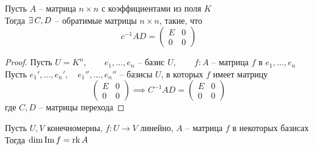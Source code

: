 \begin{implication}
	Пусть $ A $ -- матрица $ n \times n $ с коэффициентами из поля $ K $ \\
    Тогда $ \exists\, C, D $ -- обратимые матрицы $ n \times n $, такие, что
    $$ c^{-1} A D =
    \begin{pmatrix}
    	E & 0 \\
        0 & 0
    \end{pmatrix} $$
\end{implication}

\begin{proof}
	Пусть $ U = K^n, \qquad e_1, ..., e_n $ -- базис $ U, \qquad f : A $ -- матрица $ f $ в $ e_1, ..., e_n $ \\
    Пусть $ e_1', ..., e_n', \quad e_1'', ..., e_n'' $ -- базисы $ U $, в которых $ f $ имеет матрицу
    $$
    \begin{pmatrix}
    	E & 0 \\
        0 & 0
    \end{pmatrix} \implies C^{-1} A D =
    \begin{pmatrix}
    	E & 0 \\
        0 & 0
    \end{pmatrix} $$
    где $ C, D $ -- матрицы перехода
\end{proof}

\begin{theorem}
	Пусть $ U, V $ конечномерны, $ f : U \to V $ линейно, $ A $ -- матрица $ f $ в некоторых базисах \\
    Тогда $ \dim \operatorname{Im} f = \operatorname{rk} A $
\end{theorem}

